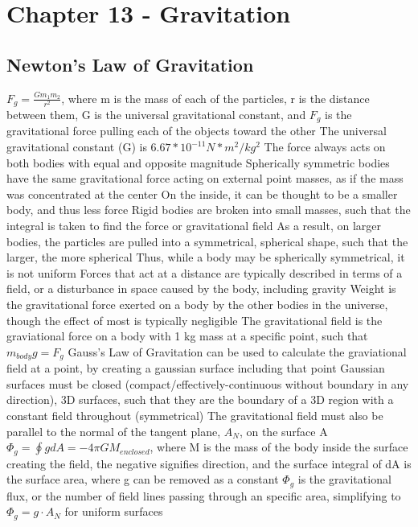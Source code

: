\documentclass[11 pt, twoside]{article}
\newenvironment{outline*}
{
	\begin{outline}[enumerate]
	}
	{\end{outline}
}
\begin{document}
\section{Chapter 13 - Gravitation}
\subsection{Newton's Law of Gravitation}
\begin{outline*}
\1 $F_g = \frac{Gm_1m_2}{r^2}$, where m is the mass of each of the particles, r is the distance between them, G is the universal gravitational constant, and $F_g$ is the gravitational force pulling each of the objects toward the other
\2 The universal gravitational constant (G) is $6.67 * 10^{-11} N*m^2/kg^2$
\2 The force always acts on both bodies with equal and opposite magnitude
\2 Spherically symmetric bodies have the same gravitational force acting on external point masses, as if the mass was concentrated at the center
\2 On the inside, it can be thought to be a smaller body, and thus less force
\2 Rigid bodies are broken into small masses, such that the integral is taken to find the force or gravitational field
\1 As a result, on larger bodies, the particles are pulled into a symmetrical, spherical shape, such that the larger, the more spherical
\2 Thus, while a body may be spherically symmetrical, it is not uniform
\1 Forces that act at a distance are typically described in terms of a field, or a disturbance in space caused by the body, including gravity
\1 Weight is the gravitational force exerted on a body by the other bodies in the universe, though the effect of most is typically negligible
\2 The gravitational field is the graviational force on a body with 1 kg mass at a specific point, such that $m_{body}g = F_g$
\1 Gauss’s Law of Gravitation can be used to calculate the graviational field at a point, by creating a gaussian surface including that point
\2 Gaussian surfaces must be closed (compact/effectively-continuous without boundary in any direction), 3D surfaces, such that they are the boundary of a 3D region with a constant field throughout (symmetrical)
\2 The gravitational field must also be parallel to the normal of the tangent plane, $A_N$, on the surface A
\2 $\Phi_g = \oint gdA = -4\pi GM_{enclosed}$, where M is the mass of the body inside the surface creating the field, the negative signifies direction, and the surface integral of dA is the surface area, where g can be removed as a constant
\2 $\Phi_g$ is the gravitational flux, or the number of field lines passing through an specific area, simplifying to $\Phi_g = g \cdot A_N$ for uniform surfaces
\end{outline*}
\end{document}
